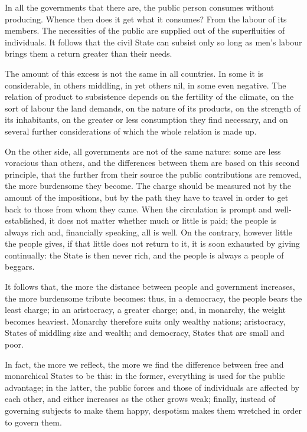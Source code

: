 \documentclass[12pt]{report}
\begin{document}
In all the governments that there are, the public person consumes without producing. Whence then does it get what it consumes? From the labour of its members. The necessities of the public are supplied out of the superfluities of individuals. It follows that the civil State can subsist only so long as men's labour brings them a return greater than their needs.

The amount of this excess is not the same in all countries. In some it is considerable, in others middling, in yet others nil, in some even negative. The relation of product to subsistence depends on the fertility of the climate, on the sort of labour the land demands, on the nature of its products, on the strength of its inhabitants, on the greater or less consumption they find necessary, and on several further considerations of which the whole relation is made up.

On the other side, all governments are not of the same nature: some are less voracious than others, and the differences between them are based on this second principle, that the further from their source the public contributions are removed, the more burdensome they become. The charge should be measured not by the amount of the impositions, but by the path they have to travel in order to get back to those from whom they came. When the circulation is prompt and well-established, it does not matter whether much or little is paid; the people is always rich and, financially speaking, all is well. On the contrary, however little the people gives, if that little does not return to it, it is soon exhausted by giving continually: the State is then never rich, and the people is always a people of beggars.

It follows that, the more the distance between people and government increases, the more burdensome tribute becomes: thus, in a democracy, the people bears the least charge; in an aristocracy, a greater charge; and, in monarchy, the weight becomes heaviest. Monarchy therefore suits only wealthy nations; aristocracy, States of middling size and wealth; and democracy, States that are small and poor.

In fact, the more we reflect, the more we find the difference between free and monarchical States to be this: in the former, everything is used for the public advantage; in the latter, the public forces and those of individuals are affected by each other, and either increases as the other grows weak; finally, instead of governing subjects to make them happy, despotism makes them wretched in order to govern them.
\end{document}
